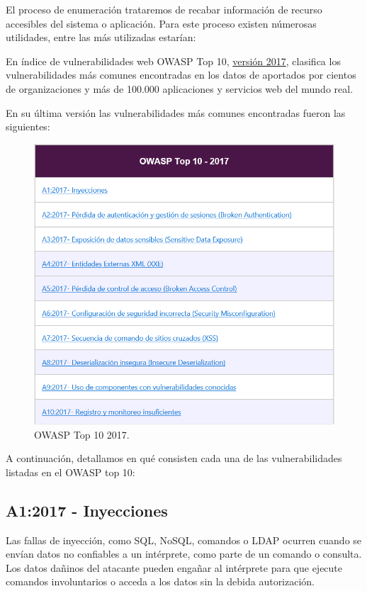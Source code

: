 El proceso de enumeración trataremos de recabar información de recurso accesibles del sistema 
o aplicación. Para este proceso existen númerosas utilidades, entre las más utilizadas estarían:

En índice de vulnerabilidades web OWASP Top 10, \href{https://wiki.owasp.org/images/5/5e/OWASP-Top-10-2017-es.pdf}{versión 2017}, 
clasifica los vulnerabilidades más comunes encontradas en los datos de aportados por cientos de organizaciones 
y más de 100.000 aplicaciones y servicios web del mundo real.

En su última versión las vulnerabilidades más comunes encontradas fueron las siguientes:

\begin{figure}[!htb] 
    \centering
    \captionsetup{width=1\linewidth} 
    \includegraphics[width=\linewidth]{./imagenes/012_OWASP_Top_10_2017.png}
    \caption{OWASP Top 10 2017.}  
\end{figure}

A continuación, detallamos en qué consisten cada una de las vulnerabilidades listadas en el OWASP top 10:

\subsection{A1:2017 - Inyecciones}

Las fallas de inyección, como SQL, NoSQL, comandos o LDAP ocurren cuando se envían datos no
confiables a un intérprete, como parte de un comando o consulta. Los datos dañinos del atacante
pueden engañar al intérprete para que ejecute comandos involuntarios o acceda a los datos sin
la debida autorización.

